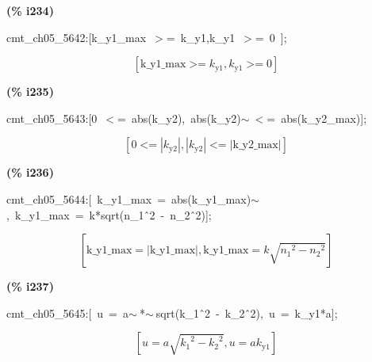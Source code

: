 \documentclass[fleqn]{article}
\begin{document}
\noindent
\begin{minipage}[t]{4.000000em}\color{red}\bfseries
(\% i234)	
\end{minipage}
\begin{minipage}[t]{\textwidth}\color{blue}
cmt\_ch05\_5642:[k\_y1\_max\ \ensuremath{>}=\ k\_y1,k\_y1\ \ensuremath{>}=\ 0\ ];
\end{minipage}
\[\displaystyle \tag{\% o234} 
\left[ \ensuremath{\mathrm{k\_ y1\_ max}}\operatorname{>  =}{k_{\ensuremath{\mathrm{y1}}}}\operatorname{,}{k_{\ensuremath{\mathrm{y1}}}}\operatorname{>  =}0\right] \mbox{}
\]


\noindent
\begin{minipage}[t]{4.000000em}\color{red}\bfseries
(\% i235)	
\end{minipage}
\begin{minipage}[t]{\textwidth}\color{blue}
cmt\_ch05\_5643:[0\ \ensuremath{<}=\ abs(k\_y2),\ abs(k\_y2)\ensuremath{\sim\ }\ensuremath{<}=\ abs(k\_y2\_max)];
\end{minipage}
\[\displaystyle \tag{\% o235} 
\left[ 0\operatorname{<  =}\left| {k_{\ensuremath{\mathrm{y2}}}}\right| \operatorname{,}\left| {k_{\ensuremath{\mathrm{y2}}}}\right| \operatorname{<  =}\left| \ensuremath{\mathrm{k\_ y2\_ max}}\right| \right] \mbox{}
\]


\noindent
\begin{minipage}[t]{4.000000em}\color{red}\bfseries
(\% i236)	
\end{minipage}
\begin{minipage}[t]{\textwidth}\color{blue}
cmt\_ch05\_5644:[\ k\_y1\_max\ =\ abs(k\_y1\_max)\ensuremath{\sim\ },\ k\_y1\_max\ =\ k*sqrt(n\_1\^\ 2\ -\ n\_2\^\ 2)];
\end{minipage}
\[\displaystyle \tag{\% o236} 
\left[ \ensuremath{\mathrm{k\_ y1\_ max}}=\left| \ensuremath{\mathrm{k\_ y1\_ max}}\right| \operatorname{,}\ensuremath{\mathrm{k\_ y1\_ max}}=k \sqrt{{{{n_1}}^{2}}-{{{n_2}}^{2}}}\right] \mbox{}
\]


\noindent
\begin{minipage}[t]{4.000000em}\color{red}\bfseries
(\% i237)	
\end{minipage}
\begin{minipage}[t]{\textwidth}\color{blue}
cmt\_ch05\_5645:[\ u\ =\ a\ensuremath{\sim\ }*\ensuremath{\sim\ }sqrt(k\_1\^\ 2\ -\ k\_2\^\ 2),\ u\ =\ k\_y1*a];
\end{minipage}
\[\displaystyle \tag{\% o237} 
\left[ u=a \sqrt{{{{k_1}}^{2}}-{{{k_2}}^{2}}}\operatorname{,}u=a {k_{\ensuremath{\mathrm{y1}}}}\right] \mbox{}
\]
\end{document}
